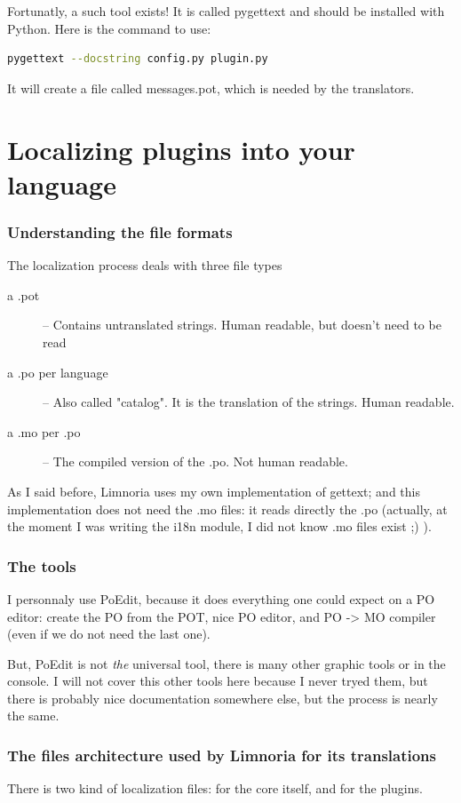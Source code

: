 \documentclass[a4paper,11pt]{article}
\begin{document}
    Fortunatly, a such tool exists! It is called pygettext and should be
    installed with Python. Here is the command to use:
    \begin{lstlisting}[language=bash]
      pygettext --docstring config.py plugin.py
    \end{lstlisting}
    It will create a file called messages.pot, which is needed by the
    translators.

\newpage
\part{Localizing plugins into your language}
  \section{Understanding the file formats}
    The localization process deals with three file types
    \begin{description}
      \item[a .pot] -- Contains untranslated strings. Human
        readable, but doesn't need to be read
      \item[a .po per language] -- Also called "catalog". It is the
        translation of the strings. Human readable.
      \item[a .mo per .po] -- The compiled version of the .po. Not human
        readable.
    \end{description}
    As I said before, Limnoria uses my own implementation of gettext; and
    this implementation does not need the .mo files: it reads directly the
    .po (actually, at the moment I was writing the i18n module, I did not
    know .mo files exist ;) ).
      
  \section{The tools}
    I personnaly use PoEdit, because it does everything one could expect on
    a PO editor: create the PO from the POT, nice PO editor, and PO -> MO
    compiler (even if we do not need the last one).
    
    But, PoEdit is not \emph{the} universal tool, there is many other
    graphic tools or in the console. I will not cover this other tools
    here because I never tryed them, but there is probably nice documentation
    somewhere else, but the process is nearly the same.
    
  \section{The files architecture used by Limnoria for its translations}
    There is two kind of localization files: for the core itself, and for
    the plugins.
    
\end{document}
